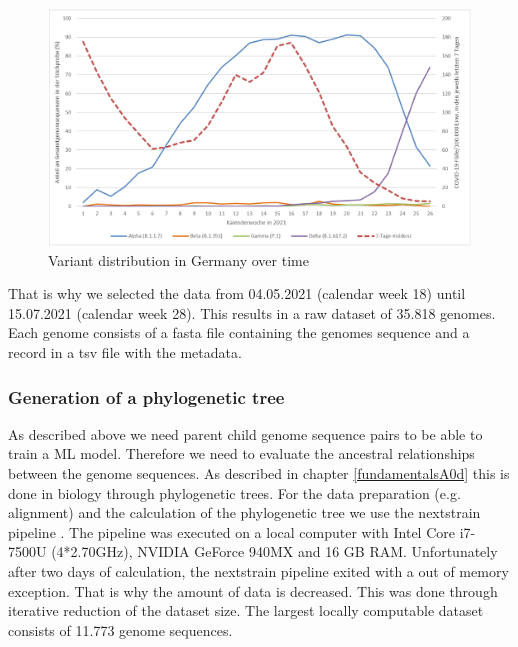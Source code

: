 \begin{figure}[ht]
	\centering
	\includegraphics[width=1.0\linewidth]{figures/rkiVariantDistribution.png}
	\caption{Variant distribution in Germany over time \cite{robertkochinstituteditorBerichtVirusvariantenSARSCoV22021}}
	\label{rkiVariantDistribution}
\end{figure}

That is why we selected the data from 04.05.2021 (calendar week 18) until 15.07.2021 (calendar week 28). This results in a raw dataset of 35.818 genomes.
Each genome consists of a fasta file containing the genomes sequence and a record in a tsv file with the metadata.



\subsubsection{Generation of a phylogenetic tree}
\label{ch:approachAb}

As described above we need parent child genome sequence pairs to be able to train a \ac{ML} model. Therefore we need to evaluate the ancestral relationships between the genome sequences.
As described in chapter \ref{fundamentalsA0d} this is done in biology through phylogenetic trees.
For the data preparation (e.g. alignment) and the calculation of the phylogenetic tree we use the nextstrain pipeline \cite{10.1093/bioinformatics/bty407}.
The pipeline was executed on a local computer with Intel Core i7-7500U (4*2.70GHz), NVIDIA GeForce 940MX and 16 GB RAM.
Unfortunately after two days of calculation, the nextstrain pipeline exited with a out of memory exception. That is why the amount of data is decreased. This was done through iterative reduction of the dataset size. The largest locally computable dataset consists of 11.773 genome sequences.

